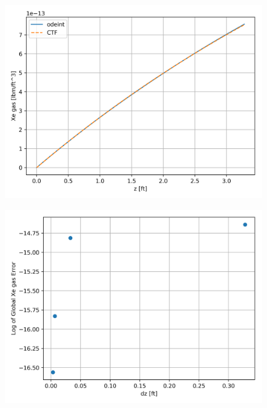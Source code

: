 \FloatBarrier
\newpage

\begin{figure}[p] 
\centering
\begin{minipage}{.5\textwidth}
  \centering
  \includegraphics[width=.9\linewidth]{images/transportSpeciesIntAreaXeGas.png}
  \label{fig:IntArea_source_xe_gas_sol}
\end{minipage}%
\begin{minipage}{.5\textwidth}
  \centering
  \includegraphics[width=.9\linewidth]{images/transportedSpeciesIntAreaXeGasError.png}
  \label{fig:IntArea_source_xe_gas_error}
\end{minipage}
\end{figure}

